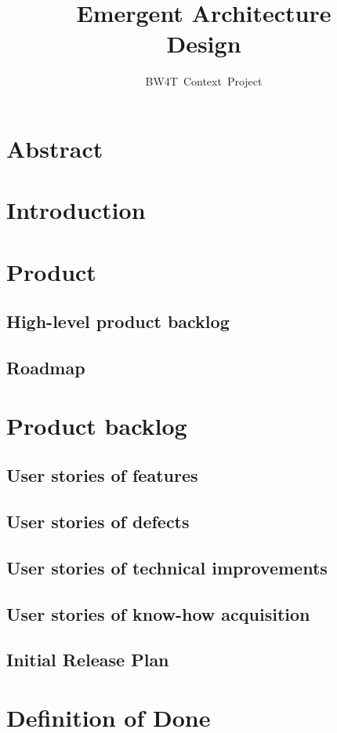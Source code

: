 \documentclass[oneside]{tudelft-report}
\begin{document}
\frontmatter

\title[Blocks World for Teams]{Emergent Architecture\\ Design}
\author{BW4T~Context~Project}
\makecover





\pagebreak
\section*{Abstract}

\pagebreak
\tableofcontents
\pagebreak
\section{Introduction}


\section{Product}
\subsection{High-level product backlog}
\subsection{Roadmap}


\section{Product backlog}
\subsection{User stories of features}


\subsection{User stories of defects}
\subsection{User stories of technical improvements}
%
\subsection{User stories of know-how acquisition}
%
\subsection{Initial Release Plan}
%


\section{Definition of Done}

\printglossaries

\end{document}
